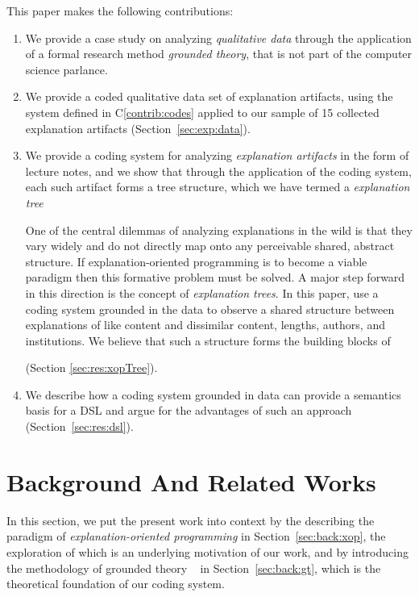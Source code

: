 \documentclass[sigconf]{acmart}
\begin{document}
This paper makes the following contributions:
%
\begin{enumerate}[C1.]

\item \label{contrib:method}
  We provide a case study on analyzing \emph{qualitative data} through the
  application of a formal research method \emph{grounded theory}, that is not
  part of the computer science parlance.

\item \label{contrib:data}
%
We provide a coded qualitative data set of explanation artifacts, using the
system defined in C\ref{contrib:codes} applied to our sample of 15 collected
explanation artifacts (Section~\ref{sec:exp:data}).

\item \label{contrib:codes}
%
We provide a coding system for analyzing \emph{explanation artifacts} in the
form of lecture notes, and we show that through the application of the coding
system, each such artifact forms a tree structure, which we have termed a
\emph{explanation tree}

 One of the central dilemmas of analyzing explanations in the
wild is that they vary widely and do not directly map onto any perceivable
shared, abstract structure. If explanation-oriented programming is to become a
viable paradigm then this formative problem must be solved. A major step forward
in this direction is the concept of \emph{explanation trees}. In this paper, use
a coding system grounded in the data to observe a shared structure between
explanations of like content and dissimilar content, lengths, authors, and
institutions. We believe that such a structure forms the building blocks of

(Section \ref{sec:res:xopTree}).


\item \label{contrib:dsl}
%
  We describe how a coding system grounded in data can provide a
  semantics basis for a DSL and argue for the advantages of such an approach
  (Section~\ref{sec:res:dsl}).
%
\end{enumerate}

\noindent

\section{Background And Related Works}
\label{sec:back}

In this section, we put the present work into context by the describing the
paradigm of \emph{explanation-oriented programming} in
Section~\ref{sec:back:xop}, the exploration of which is an underlying
motivation of our work, and by introducing the methodology of grounded theory
~\cite{Strauss67discoveryof} in Section~\ref{sec:back:gt}, which is the
theoretical foundation of our coding system.
\end{document}
